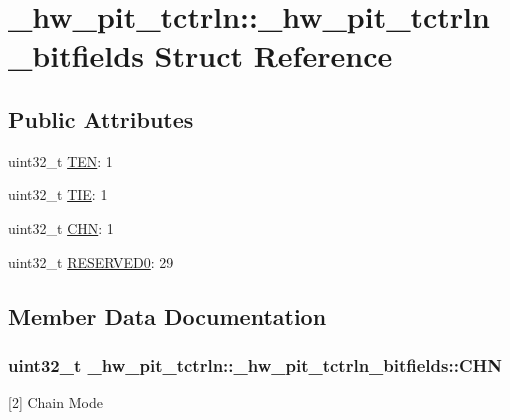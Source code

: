 \hypertarget{struct__hw__pit__tctrln_1_1__hw__pit__tctrln__bitfields}{}\section{\+\_\+hw\+\_\+pit\+\_\+tctrln\+:\+:\+\_\+hw\+\_\+pit\+\_\+tctrln\+\_\+bitfields Struct Reference}
\label{struct__hw__pit__tctrln_1_1__hw__pit__tctrln__bitfields}
\subsection*{Public Attributes}
\begin{DoxyCompactItemize}
\item 
uint32\+\_\+t \hyperlink{struct__hw__pit__tctrln_1_1__hw__pit__tctrln__bitfields_a1a50e0c4edd650992ae48e240d6c4945}{T\+EN}\+: 1
\item 
uint32\+\_\+t \hyperlink{struct__hw__pit__tctrln_1_1__hw__pit__tctrln__bitfields_ac7d0a641ba437fa6e5ee748e3681dac6}{T\+IE}\+: 1
\item 
uint32\+\_\+t \hyperlink{struct__hw__pit__tctrln_1_1__hw__pit__tctrln__bitfields_a6925eadc4b8382d452823eae00eca58e}{C\+HN}\+: 1
\item 
uint32\+\_\+t \hyperlink{struct__hw__pit__tctrln_1_1__hw__pit__tctrln__bitfields_a80be84f9714d4426b277093c24de0154}{R\+E\+S\+E\+R\+V\+E\+D0}\+: 29
\end{DoxyCompactItemize}


\subsection{Member Data Documentation}
\subsubsection[{\texorpdfstring{C\+HN}{CHN}}]{\setlength{\rightskip}{0pt plus 5cm}uint32\+\_\+t \+\_\+hw\+\_\+pit\+\_\+tctrln\+::\+\_\+hw\+\_\+pit\+\_\+tctrln\+\_\+bitfields\+::\+C\+HN}\hypertarget{struct__hw__pit__tctrln_1_1__hw__pit__tctrln__bitfields_a6925eadc4b8382d452823eae00eca58e}{}\label{struct__hw__pit__tctrln_1_1__hw__pit__tctrln__bitfields_a6925eadc4b8382d452823eae00eca58e}
\mbox{[}2\mbox{]} Chain Mode 
